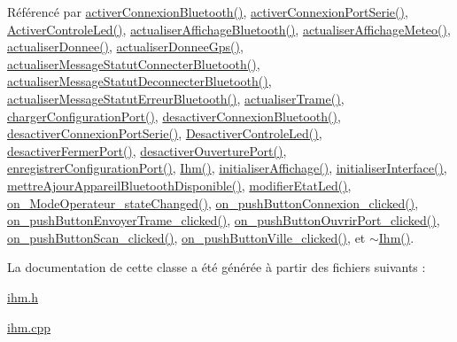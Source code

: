Référencé par \hyperlink{class_ihm_ac5d166864f1389aa44b0a6784f1977ca}{activer\+Connexion\+Bluetooth()}, \hyperlink{class_ihm_a58ae5ccbff166bcb6723db14a9cf04d9}{activer\+Connexion\+Port\+Serie()}, \hyperlink{class_ihm_a4c456231c8af9eab099e9aaadf8a378b}{Activer\+Controle\+Led()}, \hyperlink{class_ihm_a02118154be39cdd3de7fdbdbe396a534}{actualiser\+Affichage\+Bluetooth()}, \hyperlink{class_ihm_a65487c8229375ff72290bed145876737}{actualiser\+Affichage\+Meteo()}, \hyperlink{class_ihm_a7c0a160f30e11a4f8d56b174e07566fe}{actualiser\+Donnee()}, \hyperlink{class_ihm_a3ca276093d65c42a5fc5a87cbca1972a}{actualiser\+Donnee\+Gps()}, \hyperlink{class_ihm_a5d7e6bdacfedc0f0dc4d7b3516454788}{actualiser\+Message\+Statut\+Connecter\+Bluetooth()}, \hyperlink{class_ihm_ad73cc62bafa9c43288f69fbac2b80508}{actualiser\+Message\+Statut\+Deconnecter\+Bluetooth()}, \hyperlink{class_ihm_a29b4c5fba871a30f7f2e5fbe08a2087d}{actualiser\+Message\+Statut\+Erreur\+Bluetooth()}, \hyperlink{class_ihm_a94ea90d27fc0aa7598cf270dd3be98eb}{actualiser\+Trame()}, \hyperlink{class_ihm_a7341abb08452b21ef2e5c8cb5095d5b0}{charger\+Configuration\+Port()}, \hyperlink{class_ihm_a7ff481c3a05c7d84be2b66552fafd79e}{desactiver\+Connexion\+Bluetooth()}, \hyperlink{class_ihm_a3c792f8eeef5216e76cdb9d9e13eb1aa}{desactiver\+Connexion\+Port\+Serie()}, \hyperlink{class_ihm_a8315a1d902efb0434267778f8144da96}{Desactiver\+Controle\+Led()}, \hyperlink{class_ihm_a6a9bb865ffa3baf686ce16f11f69c57f}{desactiver\+Fermer\+Port()}, \hyperlink{class_ihm_ab0a18639faa9f2c0b2a141321be4b973}{desactiver\+Ouverture\+Port()}, \hyperlink{class_ihm_a05afaf2191aaae673c5ecd14a6d1c921}{enregistrer\+Configuration\+Port()}, \hyperlink{class_ihm_a50a7a15775452923868348bdbe4fa51e}{Ihm()}, \hyperlink{class_ihm_a9bd8f55d47f658fa5311b7880cc94114}{initialiser\+Affichage()}, \hyperlink{class_ihm_a3c6fa78360d39cf904dc3a20b0347ddc}{initialiser\+Interface()}, \hyperlink{class_ihm_a9d9ac22e5d73a010bc75a1fcf2e7ddcb}{mettre\+Ajour\+Appareil\+Bluetooth\+Disponible()}, \hyperlink{class_ihm_af0426507c2130aefd01bdb4f825ae168}{modifier\+Etat\+Led()}, \hyperlink{class_ihm_aeb9414496621bcc42dc63d3ad6e194f9}{on\+\_\+\+Mode\+Operateur\+\_\+state\+Changed()}, \hyperlink{class_ihm_abf61dda1820e5632485de93983c40196}{on\+\_\+push\+Button\+Connexion\+\_\+clicked()}, \hyperlink{class_ihm_afd32da9e614eba44bb1d3630b48e6075}{on\+\_\+push\+Button\+Envoyer\+Trame\+\_\+clicked()}, \hyperlink{class_ihm_a9ce167b94baead6e318bbd0c5254f842}{on\+\_\+push\+Button\+Ouvrir\+Port\+\_\+clicked()}, \hyperlink{class_ihm_a277763bdb63ed529aafba7db513cb630}{on\+\_\+push\+Button\+Scan\+\_\+clicked()}, \hyperlink{class_ihm_aa943965aa565ec50e00f433100660892}{on\+\_\+push\+Button\+Ville\+\_\+clicked()}, et \hyperlink{class_ihm_add292ea9005bacd1de44dd1ed9ede5b9}{$\sim$\+Ihm()}.



La documentation de cette classe a été générée à partir des fichiers suivants \+:\begin{DoxyCompactItemize}
\item 
\hyperlink{ihm_8h}{ihm.\+h}\item 
\hyperlink{ihm_8cpp}{ihm.\+cpp}\end{DoxyCompactItemize}
